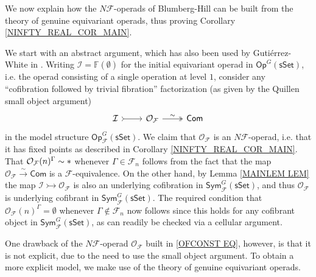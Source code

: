 \documentclass[a4paper,10pt
,draft
]{article}%
\numberwithin{equation}{section}
\numberwithin{figure}{section}
\theoremstyle{definition} %
\renewcommand{\O}{\ensuremath{\mathcal O}}
\newcommand{\1}{\ensuremath{\mathbbm 1}}%
\begin{document}
We now explain how the $N\mathcal{F}$-operads of 
Blumberg-Hill can be built from the theory of genuine equivariant operads, thus proving Corollary \ref{NINFTY_REAL_COR_MAIN}.

We start with an abstract argument, which has also been used by Guti\'{e}rrez-White in \cite{GW18}. 
Writing 
$\mathcal{I} = \mathbb{F} (\emptyset)$
for the initial equivariant operad in 
$\mathsf{Op}^G(\mathsf{sSet})$,
i.e. the operad consisting of a single operation at level $1$,
consider any 
``cofibration followed by trivial fibration'' factorization
(as given by the
Quillen small object argument)
\begin{equation}\label{OFCONST EQ}
\begin{tikzcd}
	\mathcal{I} \arrow[r, rightarrowtail] &
	\O_{\mathcal{F}}
	\arrow[r,twoheadrightarrow, "\sim"] &
	\mathsf{Com}
\end{tikzcd}
\end{equation}
in the model structure 
$\mathsf{Op}^G_{\mathcal{F}}(\mathsf{sSet})$.
We claim that $\mathcal{O}_{\mathcal{F}}$
is an $N \mathcal{F}$-operad, i.e.
that it has fixed points as described in 
Corollary \ref{NINFTY_REAL_COR_MAIN}.
That $\mathcal{O}_{\mathcal{F}}(n)^{\Gamma} \sim \**$
whenever $\Gamma \in \mathcal{F}_n$
follows from the fact that the map
$\mathcal{O}_{\mathcal{F}} \xrightarrow{\sim} \mathsf{Com}$
is a $\mathcal{F}$-equivalence.
On the other hand, by Lemma \ref{MAINLEM LEM}
the map 
$\mathcal{I} \rightarrowtail \O_{\mathcal{F}}$
is also an underlying cofibration in 
$\mathsf{Sym}^G_{\mathcal{F}}(\mathsf{sSet})$, and thus
$\mathcal{O}_{\mathcal{F}}$ is underlying cofibrant in 
$\mathsf{Sym}^G_{\mathcal{F}}(\mathsf{sSet})$.
The required condition that
$\mathcal{O}_{\mathcal{F}} (n)^{\Gamma}
= \emptyset $
whenever $\Gamma \nin \mathcal{F}_n$
now follows since this holds for any cofibrant object in $\mathsf{Sym}^G_{\mathcal{F}}(\mathsf{sSet})$,
as can readily be checked via a cellular argument.

One drawback of the 
$N \mathcal{F}$-operad $\mathcal{O}_{\mathcal{F}}$
built in \eqref{OFCONST EQ},
however, is that it is not explicit,
due to the need to use the small object argument.
To obtain a more explicit model, we make use of the theory of genuine equivariant operads.
\end{document}
